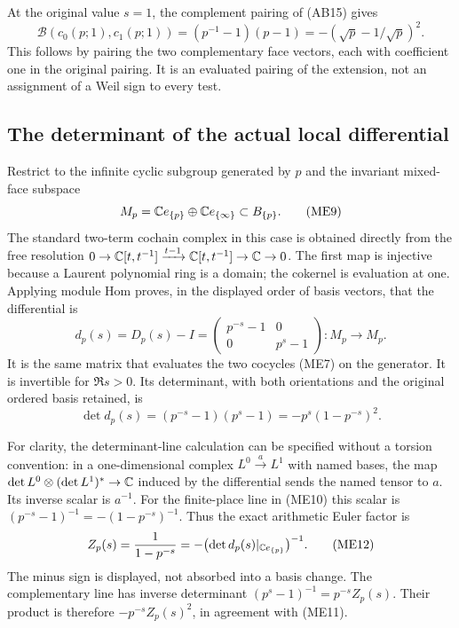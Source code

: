 At the original value $s=1$, the complement pairing of (AB15) gives
\[
 \mathscr B(c_0(p;1),c_1(p;1))
 =(p^{-1}-1)(p-1)=-(\sqrt p-1/\sqrt p)^2.
 \tag{ME8}
\]
This follows by pairing the two complementary face vectors, each with
coefficient one in the original pairing. It is an evaluated pairing of
the extension, not an assignment of a Weil sign to every test.

\subsection{The determinant of the actual local differential}
Restrict to the infinite cyclic subgroup generated by $p$ and the
invariant mixed-face subspace
\[
 M_p=\mathbb C e_{\{p\}}\oplus\mathbb C e_{\{\infty\}}\subset B_{\{p\}}.
 \tag{ME9}
\]
The standard two-term cochain complex in this case is obtained directly
from the free resolution
$0\to\mathbb C[t,t^{-1}]\xrightarrow{t-1}\mathbb C[t,t^{-1}]\to\mathbb C\to0$.
The first map is injective because a Laurent polynomial ring is a domain;
the cokernel is evaluation at one. Applying module Hom proves, in the
displayed order of basis vectors, that the differential is
\[
 d_p(s)=D_p(s)-I=
 \begin{pmatrix}p^{-s}-1&0\\0&p^s-1\end{pmatrix}:
 M_p\longrightarrow M_p.
 \tag{ME10}\label{eq:ME-differential}
\]
It is the same matrix that evaluates the two cocycles (ME7) on the
generator. It is invertible for $\Re s>0$. Its determinant, with both
orientations and the original ordered basis retained, is
\[
 \det d_p(s)=(p^{-s}-1)(p^s-1)
 =-p^s(1-p^{-s})^2.
 \tag{ME11}
\]

For clarity, the determinant-line calculation can be specified without a
torsion convention: in a one-dimensional complex
$L^0\xrightarrow{a}L^1$ with named bases, the map
$\det L^0\otimes(\det L^1)^*\to\mathbb C$ induced by the differential
sends the named tensor to $a$. Its inverse scalar is $a^{-1}$.
For the finite-place line in (ME10) this scalar is
$(p^{-s}-1)^{-1}=-(1-p^{-s})^{-1}$. Thus the exact arithmetic Euler
factor is
\[
 Z_p(s)=\frac1{1-p^{-s}}
 =-\bigl(\det d_p(s)|_{\mathbb C e_{\{p\}}}\bigr)^{-1}.
 \tag{ME12}\label{eq:ME-euler-torsion}
\]
The minus sign is displayed, not absorbed into a basis change. The
complementary line has inverse determinant
$(p^s-1)^{-1}=p^{-s}Z_p(s)$. Their product is therefore
$-p^{-s}Z_p(s)^2$, in agreement with (ME11).

